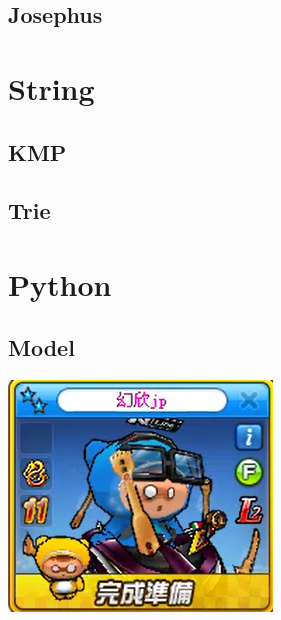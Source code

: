     \subsection{Josephus}
        
        
\section{String}
    \subsection{KMP}
        
    \subsection{Trie}
        

\section{Python}
    \subsection{Model}
        
\includegraphics{Contents/runrun.png}